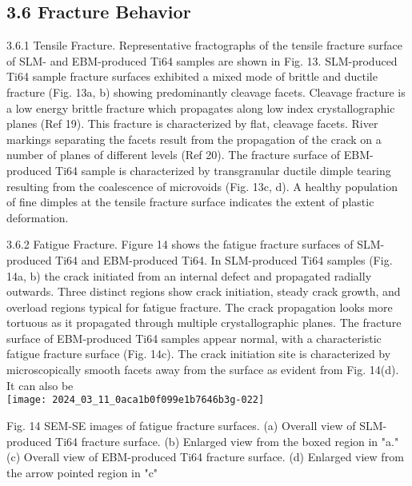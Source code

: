 \documentclass[10pt]{article}
\begin{document}
\subsection*{3.6 Fracture Behavior}
3.6.1 Tensile Fracture. Representative fractographs of the tensile fracture surface of SLM- and EBM-produced Ti64 samples are shown in Fig. 13. SLM-produced Ti64 sample fracture surfaces exhibited a mixed mode of brittle and ductile fracture (Fig. 13a, b) showing predominantly cleavage facets. Cleavage fracture is a low energy brittle fracture which propagates along low index crystallographic planes (Ref 19). This fracture is characterized by flat, cleavage facets. River markings separating the facets result from the propagation of the crack on a number of planes of different levels (Ref 20). The fracture surface of EBM-produced Ti64 sample is characterized by transgranular ductile dimple tearing resulting from the coalescence of microvoids (Fig. 13c, d). A healthy population of fine dimples at the tensile fracture surface indicates the extent of plastic deformation.

3.6.2 Fatigue Fracture. Figure 14 shows the fatigue fracture surfaces of SLM-produced Ti64 and EBM-produced Ti64. In SLM-produced Ti64 samples (Fig. 14a, b) the crack initiated from an internal defect and propagated radially outwards. Three distinct regions show crack initiation, steady crack growth, and overload regions typical for fatigue fracture. The crack propagation looks more tortuous as it propagated through multiple crystallographic planes. The fracture surface of EBM-produced Ti64 samples appear normal, with a characteristic fatigue fracture surface (Fig. 14c). The crack initiation site is characterized by microscopically smooth facets away from the surface as evident from Fig. 14(d). It can also be\\
\texttt{[image: 2024\_03\_11\_0aca1b0f099e1b7646b3g-022]}

Fig. 14 SEM-SE images of fatigue fracture surfaces. (a) Overall view of SLM-produced Ti64 fracture surface. (b) Enlarged view from the boxed region in "a." (c) Overall view of EBM-produced Ti64 fracture surface. (d) Enlarged view from the arrow pointed region in "c"
\end{document}
